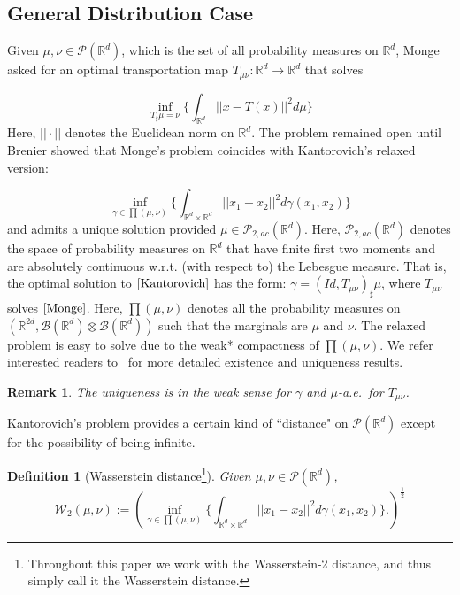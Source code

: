\documentclass[twoside,11pt]{article}
\newtheorem{rema}{Remark}[section]{\bfseries}{\itshape}
\newtheorem{defi}{Definition}[section]{\bfseries}{\itshape}
\begin{document}
\subsection{General Distribution Case} \label{s:prelim general distribution case}

Given $\mu, \nu \in \mathcal{P}(\mathbb{R}^d)$,  which is the set of all probability measures on $\mathbb{R}^d$, Monge asked for an optimal transportation map $T_{\mu \nu}: \mathbb{R}^d \rightarrow \mathbb{R}^d$ that solves

\begin{equation}\label{Monge}
\inf_{ T_{\sharp} \mu = \nu } \Big\{\int_{\mathbb{R}^d} ||x - T(x)||^2 d \mu\Big\}
\end{equation}
Here, $||\cdot||$ denotes the Euclidean norm on $\mathbb{R}^d$. The problem remained open until Brenier showed that Monge's problem coincides with Kantorovich's relaxed version:

\begin{equation}\label{Kantorovich}
\inf_{ \gamma \in \prod (\mu,\nu) } \Big\{\int_{\mathbb{R}^d \times \mathbb{R}^d} ||x_1 - x_2||^2 d \gamma(x_1,x_2)\Big\}
\end{equation}
and admits a unique solution provided $\mu \in \mathcal{P}_{2,ac}(\mathbb{R}^d)$. Here, $\mathcal{P}_{2,ac}(\mathbb{R}^d)$ denotes the space of probability measures on $\mathbb{R}^d$ that have finite first two moments and are absolutely continuous w.r.t. (with respect to) the Lebesgue measure. That is, the optimal solution to $\eqref{Kantorovich}$ has the form: $\gamma = (Id, T_{\mu \nu})_{\sharp} \mu$, where $T_{\mu \nu}$ solves $\eqref{Monge}$. Here, $\prod (\mu,\nu)$ denotes all the probability measures on $(\mathbb{R}^{2d}, \mathcal{B}(\mathbb{R}^d) \otimes \mathcal{B}(\mathbb{R}^d))$ such that the marginals are $\mu$ and $\nu$. The relaxed problem is easy to solve due to the weak* compactness of $\prod (\mu,\nu)$. We refer interested readers to~\cite{villani2021topics, villani2009optimal} for more detailed existence and uniqueness results. 

\begin{rema}
The uniqueness is in the weak sense for $\gamma$ and $\mu$-a.e.\ for $T_{\mu \nu}$.
\end{rema}

Kantorovich's problem provides a certain kind of ``distance" on $\mathcal{P}(\mathbb{R}^d)$ except for the possibility of being infinite.

\begin{defi}[Wasserstein distance\footnote{Throughout this paper we work with the Wasserstein-2 distance, and thus simply call it the Wasserstein distance.}]
Given $\mu, \nu \in \mathcal{P}(\mathbb{R}^d)$,
\begin{equation}
\mathcal{W}_2(\mu,\nu) := \left(\inf_{ \gamma \in \prod (\mu,\nu) } \Big\{\int_{\mathbb{R}^d \times \mathbb{R}^d} ||x_1 - x_2||^2 d \gamma(x_1,x_2)\Big\}.\right)^{\frac{1}{2}}
\end{equation}

\end{defi}
\end{document}
